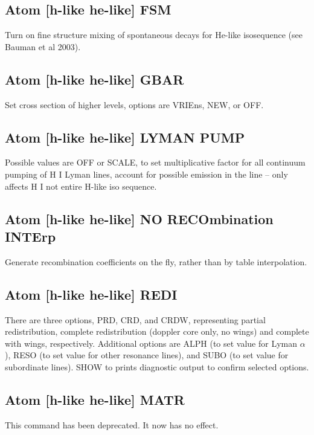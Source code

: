 \subsection{Atom [h-like \OR{} he-like] FSM}

Turn on fine structure mixing of spontaneous decays for
He-like isosequence (see Bauman et al 2003).

\subsection{Atom [h-like \OR{} he-like] GBAR}

Set cross section of higher levels, options are VRIEns, NEW, or OFF.

\subsection{Atom [h-like \OR{} he-like] LYMAN PUMP}

Possible values are OFF or SCALE, to set multiplicative factor for all
continuum pumping of H I Lyman lines, account for possible emission in
the line -- only affects H I not entire H-like iso sequence.

\subsection{Atom [h-like \OR{} he-like] NO RECOmbination INTErp}

Generate recombination coefficients on the fly, rather than by table
interpolation.

\subsection{Atom [h-like \OR{} he-like] REDI}

There are three options, PRD, CRD, and CRDW, representing partial
redistribution, complete redistribution (doppler core only, no wings)
and complete with wings, respectively.  Additional options are ALPH
(to set value for Lyman $\alpha$), RESO (to set value for other
resonance lines), and SUBO (to set value for subordinate lines).  SHOW
to prints diagnostic output to confirm selected options.

\subsection{Atom [h-like \OR{} he-like] MATR}

This command has been deprecated.  It now has no effect.

